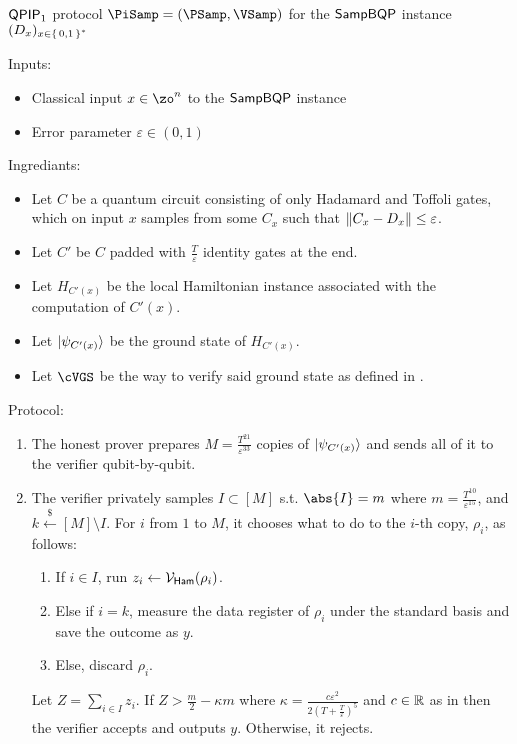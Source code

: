 \begin{protocol}{$\operatorname{\mathsf{QPIP}}_1$ protocol $\PiSamp=(\PSamp, \VSamp)$ for the $\operatorname{\mathsf{SampBQP}}$ instance $(D_x)_{x\in\set{0, 1}^*}$}
	\label{ProtoQPIP1}

	Inputs: 
	\begin{itemize}
		\item Classical input $x\in\zo^n$ to the $\operatorname{\mathsf{SampBQP}}$ instance
		\item Error parameter $\varepsilon\in(0, 1)$
	\end{itemize}

	Ingrediants:
	\begin{itemize}
		\item Let $C$ be a quantum circuit consisting of only Hadamard and Toffoli gates, which on input $x$ samples from some $C_x$ such that $\left\lVert C_x-D_x\right\rVert\leq\varepsilon$.
		\item Let $C'$ be $C$ padded with $\frac{T}{\varepsilon}$ identity gates at the end.
		\item Let $H_{C'(x)}$ be the local Hamiltonian instance associated with the computation of $C'(x)$.
		\item Let $\ket{\psi_{C'(x)}}$ be the ground state of $H_{C'(x)}$.
		\item Let $\cVGS$ be the way to verify said ground state as defined in . 
	\end{itemize}

	Protocol:
	\begin{enumerate}
		\item The honest prover prepares $M=\frac{T^{21}}{\varepsilon^{33}}$ copies of $\ket{\psi_{C'(x)}}$ and sends all of it to the verifier qubit-by-qubit.
		\item The verifier privately samples $I\subset[M]$ s.t. $\abs{I}=m$ where $m=\frac{T^{10}}{\varepsilon^{15}}$, and $k\xleftarrow{\$}[M]\setminus I$.
			For $i$ from $1$ to $M$, it chooses what to do to the $i$-th copy, $\rho_i$, as follows:
		\begin{enumerate}
			\item If $i\in I$, run $z_i\leftarrow\mathcal{V}_{\mathsf{Ham}}(\rho_i)$.
			\item Else if $i=k$, measure the data register  of $\rho_i$ under the standard basis and save the outcome as $y$.
			\item Else, discard $\rho_i$.
		\end{enumerate}
			Let $Z=\sum_{i\in I} z_i$. If $Z>\frac{m}{2}-\kappa m$ where $\kappa=\frac{c\varepsilon^2}{2\left(T+\frac{T}{\varepsilon}\right)^5}$ and $c\in\mathbb{R}$ as in  then the verifier accepts and outputs $y$. Otherwise, it rejects. 
	\end{enumerate}
\end{protocol}

